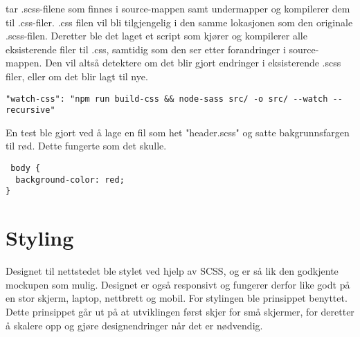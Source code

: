  tar .scss-filene som finnes i source-mappen samt undermapper og kompilerer dem til .css-filer. .css filen vil bli tilgjengelig i den samme lokasjonen som den originale .scss-filen. Deretter ble det laget et script som kjører  og kompilerer alle eksisterende filer til .css, samtidig som den ser etter forandringer i source-mappen. Den vil altså detektere om det blir gjort endringer i eksisterende .scss filer, eller om det blir lagt til nye. 

\begin{lstlisting}[caption={Script som detekterer scss endringer}]
 "watch-css": "npm run build-css && node-sass src/ -o src/ --watch --recursive"
\end{lstlisting}

En test ble gjort ved å lage en fil som het "header.scss" og satte bakgrunnsfargen til rød. Dette fungerte som det skulle.

\begin{lstlisting}
 body {
  background-color: red;
}
\end{lstlisting}

\section{Styling}
Designet til nettstedet ble stylet ved hjelp av SCSS, og er så lik den godkjente mockupen som mulig. Designet er også responsivt og fungerer derfor like godt på en stor skjerm, laptop, nettbrett og mobil. For stylingen ble prinsippet  benyttet. Dette prinsippet går ut på at utviklingen først skjer for små skjermer, for deretter å skalere opp og gjøre designendringer når det er nødvendig. 






